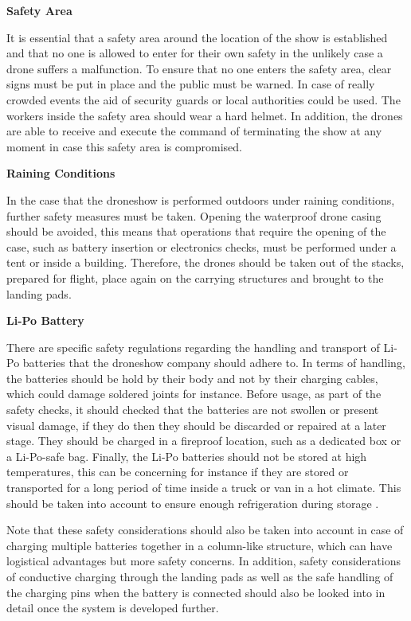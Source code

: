 \textbf{Safety Area}

It is essential that a safety area around the location of the show is established and that no one is allowed to enter for their own safety in the unlikely case a drone suffers a malfunction. To ensure that no one enters the safety area, clear signs must be put in place and the public must be warned. In case of really crowded events the aid of security guards or local authorities could be used. The workers inside the safety area should wear a hard helmet. In addition, the drones are able to receive and execute the command of terminating the show at any moment in case this safety area is compromised.

\textbf{Raining Conditions}

In the case that the droneshow is performed outdoors under raining conditions, further safety measures must be taken. Opening the waterproof drone casing should be avoided, this means that operations that require the opening of the case, such as battery insertion or electronics checks, must be performed under a tent or inside a building. Therefore, the drones should be taken out of the stacks, prepared for flight, place again on the carrying structures and brought to the landing pads. 

\textbf{Li-Po Battery}

There are specific safety regulations regarding the handling and transport of Li-Po batteries that the droneshow company should adhere to. In terms of handling, the batteries should be hold by their body and not by their charging cables, which could damage soldered joints for instance. Before usage, as part of the safety checks, it should checked that the batteries are not swollen or present visual damage, if they do then they should be discarded or repaired at a later stage. They should be charged in a fireproof location, such as a dedicated box or a Li-Po-safe bag. Finally, the Li-Po batteries should not be stored at high temperatures, this can be concerning for instance if they are stored or transported for a long period of time inside a truck or van in a hot climate. This should be taken into account to ensure enough refrigeration during storage \cite{liposafety}.

Note that these safety considerations should also be taken into account in case of charging multiple batteries together in a column-like structure, which can have logistical advantages but more safety concerns. In addition, safety considerations of conductive charging through the landing pads as well as the safe handling of the charging pins when the battery is connected should also be looked into in detail once the system is developed further.

